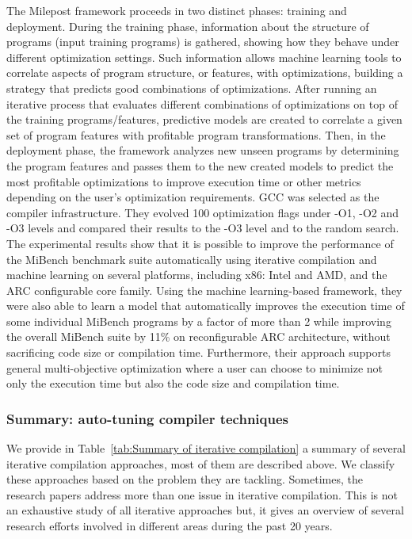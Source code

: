 The Milepost framework proceeds in two distinct phases: training and deployment. During the training phase, information about the structure of programs (input training programs) is gathered, showing how they behave under different optimization settings. Such information allows machine learning tools to correlate aspects of program structure, or features, with optimizations, building a strategy that predicts good combinations of optimizations. 
After running an iterative process that evaluates different combinations of optimizations on top of the training programs/features, predictive models are created to correlate a given set of program features with profitable program transformations. 
Then, in the deployment phase, the framework analyzes new unseen programs by determining the program features and passes them to the new created models to predict the most profitable optimizations to improve execution time or other metrics depending on the user’s optimization requirements.
GCC was selected as the compiler infrastructure. They evolved 100 optimization flags under -O1, -O2 and -O3 levels and compared their results to the -O3 level and to the random search.
The experimental results show that it is possible to improve the performance of the MiBench benchmark suite automatically using iterative compilation and machine learning on several platforms, including x86: Intel and AMD, and the ARC configurable core family. Using the machine learning-based framework, they were also able to learn a model that automatically improves the execution time of some individual MiBench programs by a factor of more than 2 while improving the overall MiBench suite by 11\% on reconfigurable ARC architecture, without sacrificing code size or compilation time. Furthermore, their approach supports general multi-objective optimization where a user can choose to minimize not only the execution time but also the code size and compilation time.



\subsubsection{Summary: auto-tuning compiler techniques}
We provide in Table~\ref{tab:Summary of iterative compilation} a summary of several iterative compilation approaches, most of them are described above. We classify these approaches based on the problem they are tackling. Sometimes, the research papers address more than one issue in iterative compilation. This is not an exhaustive study of all iterative approaches but, it gives an overview of several research efforts involved in different areas during the past 20 years.

